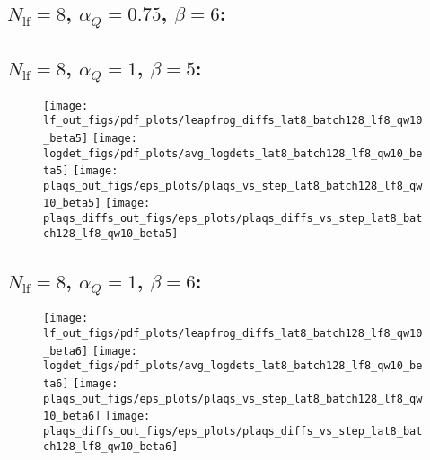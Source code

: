 \clearpage
\subsection{\texorpdfstring{$N_{\mathrm{lf}} = 8$}{Nlf = 8}, \texorpdfstring{$\alpha_Q = 0.75$}{alphaq = 0.75},
\texorpdfstring{$\beta = 6$}{beta = 6}:}
%

\clearpage
\subsection{\texorpdfstring{$N_{\mathrm{lf}} = 8$}{Nlf = 7}, \texorpdfstring{$\alpha_Q = 1$}{alphaq = 1},
\texorpdfstring{$\beta = 5$}{beta = 5}:}
%
\begin{figure}[htpb]
  \centering
  \texttt{[image: lf\_out\_figs/pdf\_plots/leapfrog\_diffs\_lat8\_batch128\_lf8\_qw10\_beta5]}
  \hfill
  \texttt{[image: logdet\_figs/pdf\_plots/avg\_logdets\_lat8\_batch128\_lf8\_qw10\_beta5]}
  \hfill
  \texttt{[image: plaqs\_out\_figs/eps\_plots/plaqs\_vs\_step\_lat8\_batch128\_lf8\_qw10\_beta5]}
  \hfill
  \texttt{[image: plaqs\_diffs\_out\_figs/eps\_plots/plaqs\_diffs\_vs\_step\_lat8\_batch128\_lf8\_qw10\_beta5]}
\end{figure}

\clearpage
\subsection{\texorpdfstring{$N_{\mathrm{lf}} = 8$}{Nlf = 8}, \texorpdfstring{$\alpha_Q = 1$}{alphaq = 1},
\texorpdfstring{$\beta = 6$}{beta = 6}:}
%
\begin{figure}[htpb]
  \centering
  \texttt{[image: lf\_out\_figs/pdf\_plots/leapfrog\_diffs\_lat8\_batch128\_lf8\_qw10\_beta6]}
  \hfill
  \texttt{[image: logdet\_figs/pdf\_plots/avg\_logdets\_lat8\_batch128\_lf8\_qw10\_beta6]}
  \hfill
  \texttt{[image: plaqs\_out\_figs/eps\_plots/plaqs\_vs\_step\_lat8\_batch128\_lf8\_qw10\_beta6]}
  \hfill
  \texttt{[image: plaqs\_diffs\_out\_figs/eps\_plots/plaqs\_diffs\_vs\_step\_lat8\_batch128\_lf8\_qw10\_beta6]}
\end{figure}

